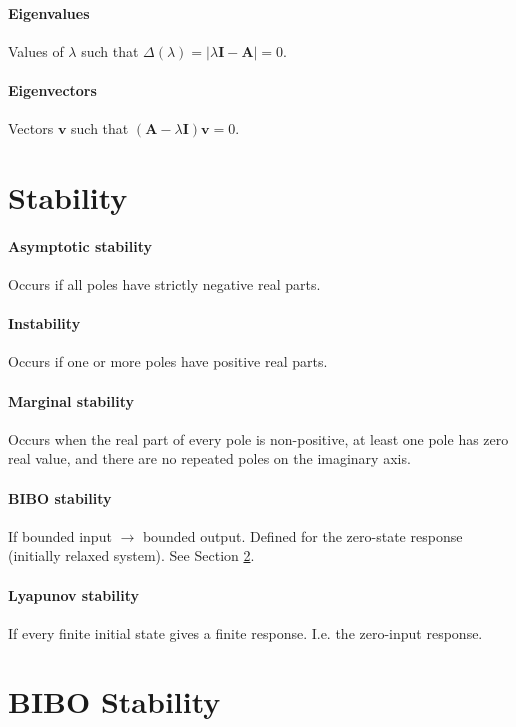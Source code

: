 \documentclass[a4paper]{article}
\newcommand{\M}[1]{\bm{#1}}
\newcommand{\Mc}[1]{\mathbf{#1}}
\newcommand{\V}[1]{\mathbf{#1}}
\begin{document}
\paragraph{Eigenvalues} Values of $\lambda$ such that $\Delta(\lambda) = |\lambda \M{I} - \M{A}| = 0$.
\paragraph{Eigenvectors} Vectors $\V{v}$ such that $(\M{A} - \lambda \Mc{I})\V{v} = 0$.



\section{Stability}
\paragraph{Asymptotic stability} Occurs if all poles have strictly negative real parts.
\paragraph{Instability} Occurs if one or more poles have positive real parts.
\paragraph{Marginal stability} Occurs when the real part of every pole is non-positive, at least one pole has zero real value, and there are no repeated poles on the imaginary axis.
\paragraph{BIBO stability} If bounded input $\rightarrow$ bounded output. Defined for the zero-state response (initially relaxed system). See Section \ref{sec:bibo}.
\paragraph{Lyapunov stability} If every finite initial state gives a finite response. I.e. the zero-input response.



\section{BIBO Stability}\label{sec:bibo}
\end{document}
